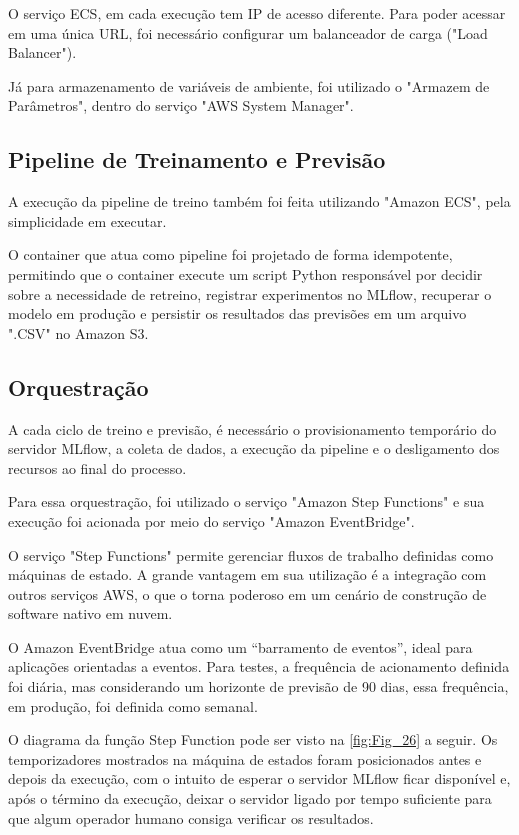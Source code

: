 O serviço \acrshort{ECS}, em cada execução tem IP de acesso diferente. Para poder acessar em uma única URL, foi necessário configurar um balanceador de carga ("Load Balancer"). 

Já para armazenamento de variáveis de ambiente, foi utilizado o "Armazem de Parâmetros", dentro do serviço "\acrshort{AWS} System Manager". 

\subsection{Pipeline de Treinamento e Previsão}

A execução da pipeline de treino também foi feita utilizando "Amazon \acrshort{ECS}", pela simplicidade em executar.  

O container que atua como pipeline foi projetado de forma idempotente, permitindo que o container execute um script Python responsável por decidir sobre a necessidade de retreino, registrar experimentos no \acrshort{MLflow}, recuperar o modelo em produção e persistir os resultados das previsões em um arquivo ".\acrshort{CSV}" no Amazon \acrshort{S3}. 

\subsection{Orquestração}

A cada ciclo de treino e previsão, é necessário o provisionamento temporário do servidor \acrshort{MLflow}, a coleta de dados, a execução da pipeline e o desligamento dos recursos ao final do processo. 

Para essa orquestração, foi utilizado o serviço "Amazon Step Functions" e sua execução foi acionada por meio do serviço "Amazon EventBridge". 

O serviço "Step Functions" permite gerenciar fluxos de trabalho definidas como máquinas de estado. A grande vantagem em sua utilização é a integração com outros serviços \acrshort{AWS}, o que o torna poderoso em um cenário de construção de software nativo em nuvem. 

O Amazon EventBridge atua como um “barramento de eventos”, ideal para aplicações orientadas a eventos. Para testes, a frequência de acionamento definida foi diária, mas considerando um horizonte de previsão de 90 dias, essa frequência, em produção, foi definida como semanal. 

O diagrama da função Step Function pode ser visto na \autoref{fig:Fig_26} a seguir. Os temporizadores mostrados na máquina de estados foram posicionados antes e depois da execução, com o intuito de esperar o servidor \acrshort{MLflow} ficar disponível e, após o término da execução, deixar o servidor ligado por tempo suficiente para que algum operador humano consiga verificar os resultados. 

